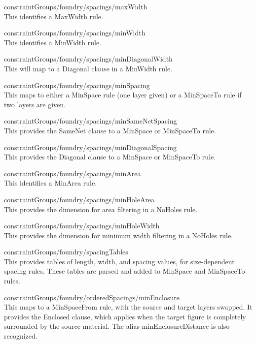 \begin{description}
\item{\vt constraintGroups/foundry/spacings/maxWidth}\\
This identifies a {\vt MaxWidth} rule.

\item{\vt constraintGroups/foundry/spacings/minWidth}\\
This identifies a {\vt MinWidth} rule.

\item{\vt constraintGroups/foundry/spacings/minDiagonalWidth}\\
This will map to a {\vt Diagonal} clause in a {\vt MinWidth} rule.

\item{\vt constraintGroups/foundry/spacings/minSpacing}\\
This maps to either a {\vt MinSpace} rule (one layer given) or a {\vt
MinSpaceTo} rule if two layers are given.

\item{\vt constraintGroups/foundry/spacings/minSameNetSpacing}\\
This provides the {\vt SameNet} clause to a {\vt MinSpace} or {\vt
MinSpaceTo} rule.

\item{\vt constraintGroups/foundry/spacings/minDiagonalSpacing}\\
This provides the {\vt Diagonal} clause to a {\vt MinSpace} or {\vt
MinSpaceTo} rule.

\item{\vt constraintGroups/foundry/spacings/minArea}\\
This identifies a {\vt MinArea} rule.

\item{\vt constraintGroups/foundry/spacings/minHoleArea}\\
This provides the dimension for area filtering in a {\vt NoHoles}
rule.

\item{\vt constraintGroups/foundry/spacings/minHoleWidth}\\
This provides the dimension for minimum width filtering in a {\vt
NoHoles} rule.

\item{\vt constraintGroups/foundry/spacingTables}\\
This provides tables of length, width, and spacing values, for
size-dependent spacing rules.  These tables are parsed and added to
{\vt MinSpace} and {\vt MinSpaceTo} rules.

\item{\vt constraintGroups/foundry/orderedSpacings/minEnclosure}\\
This maps to a {\vt MinSpaceFrom} rule, with the source and target
layers swapped.  It provides the {\vt Enclosed} clause, which applies
when the target figure is completely surrounded by the source
material.  The alias {\vt minEnclosureDistance} is also recognized.


\end{description}
